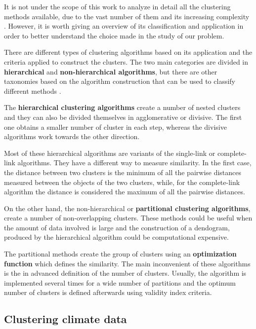 It is not under the scope of this work to analyze in detail all the clustering methods available, due to the vast number of them and its increasing complexity \cite*{Jain1999}. However, it is worth giving an overview of its classification and application in order to better understand the choice made in the study of our problem.

There are different types of clustering algorithms based on its application and the criteria applied to construct the clusters. The two main categories are divided in \textbf{hierarchical} and \textbf{non-hierarchical algorithms}, but there are other taxonomies based on the algorithm construction that can be used to classify different methods \cite*{Jain1999}.

The \textbf{hierarchical clustering algorithms} create a number of nested clusters and they can also be divided themselves in agglomerative or divisive. The first one obtains a smaller number of cluster in each step, whereas the divisive algorithms work towards the other direction.

Most of these hierarchical algorithms are variants of the single-link or complete-link algorithms. They have a different way to measure similarity. In the first case, the distance between two clusters is the minimum of all the pairwise distances measured between the objects of the two clusters, while, for the complete-link algorithm the distance is considered the maximum of all the pairwise distances.

On the other hand, the non-hierarchical or \textbf{partitional clustering algorithms}, create a number of non-overlapping clusters. These methods could be useful when the amount of data involved is large and the construction of a dendogram, produced by the hierarchical algorithm could be computational expensive.

The partitional methods create the group of clusters using an \textbf{optimization function} which defines the similarity. The main inconvenient of these algorithms is the in advanced definition of the number of clusters. Usually, the algorithm is implemented several times for a wide number of partitions and the optimum number of clusters is defined afterwards using validity index criteria.



\subsection{Clustering climate data}

